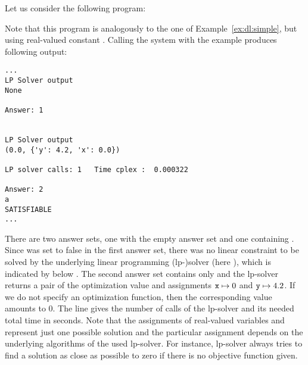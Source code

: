 \begin{example}\label{ex:lp:dl}
Let us consider the following program: 

%
Note that this program is analogously to the one of Example~\ref{ex:dl:simple}, but using real-valued constant . 
%
Calling the system with the example produces following output:
\begin{lstlisting}[numbers=none]
...
LP Solver output
None

Answer: 1


LP Solver output
(0.0, {'y': 4.2, 'x': 0.0})

LP solver calls: 1   Time cplex :  0.000322

Answer: 2
a
SATISFIABLE
...
\end{lstlisting}
There are two answer sets, one with the empty answer set and one containing . 
%
Since  was set to false in the first answer set, 
there was no linear constraint to be solved by the underlying linear programming (lp-)solver (here \cplex), 
which is indicated by  below . 
%
The second answer set contains  only and the lp-solver returns a pair of the optimization value  and assignments $\texttt{x}\mapsto0$ and $\texttt{y}\mapsto4.2$. 
%
If we do not specify an optimization function, then the corresponding value amounts to 0.
%
The line  gives the number of calls of the lp-solver and its needed total time in seconds. 
%
Note that the assignments of real-valued variables  and  represent just one possible solution 
and the particular assignment depends on the underlying algorithms of the used lp-solver. 
%
For instance, lp-solver \cplex{} always tries to find a solution as close as possible to zero if there is no objective function given. 
\end{example}

